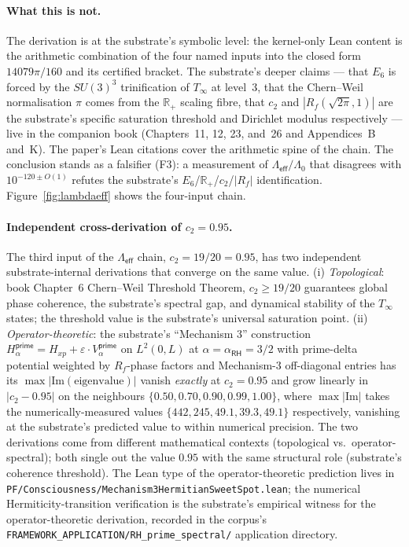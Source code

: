 \documentclass[11pt,a4paper]{amsart}
\theoremstyle{plain}
\theoremstyle{definition}
\begin{document}
\paragraph{What this is not.} The derivation is at the substrate's symbolic level: the kernel-only Lean content is the arithmetic combination of the four named inputs into the closed form $14079\pi/160$ and its certified bracket. The substrate's deeper claims --- that $E_6$ is forced by the $SU(3)^3$ trinification of $T_\infty$ at level~3, that the Chern--Weil normalisation $\pi$ comes from the $\mathbb{R}_+$ scaling fibre, that $c_2$ and $|R_f(\sqrt{2\pi}, 1)|$ are the substrate's specific saturation threshold and Dirichlet modulus respectively --- live in the companion book (Chapters~11, 12, 23, and~26 and Appendices~B and~K). The paper's Lean citations cover the arithmetic spine of the chain. The conclusion stands as a falsifier (F3): a measurement of $\Lambda_{\textsf{eff}}/\Lambda_0$ that disagrees with $10^{-120 \pm O(1)}$ refutes the substrate's $E_6$/$\mathbb{R}_+$/$c_2$/$|R_f|$ identification. Figure~\ref{fig:lambdaeff} shows the four-input chain.

\paragraph{Independent cross-derivation of $c_2 = 0.95$.} The third input of the $\Lambda_{\textsf{eff}}$ chain, $c_2 = 19/20 = 0.95$, has two independent substrate-internal derivations that converge on the same value. (i) \emph{Topological}: book Chapter~6 Chern--Weil Threshold Theorem, $c_2 \geq 19/20$ guarantees global phase coherence, the substrate's spectral gap, and dynamical stability of the $T_\infty$ states; the threshold value is the substrate's universal saturation point. (ii) \emph{Operator-theoretic}: the substrate's ``Mechanism 3'' construction $H_\alpha^{\textsf{prime}} = H_{xp} + \varepsilon \cdot V_\alpha^{\textsf{prime}}$ on $L^2(0, L)$ at $\alpha = \alpha_{\textsf{RH}} = 3/2$ with prime-delta potential weighted by $R_f$-phase factors and Mechanism-3 off-diagonal entries has its $\max|\textrm{Im}(\textrm{eigenvalue})|$ vanish \emph{exactly} at $c_2 = 0.95$ and grow linearly in $|c_2 - 0.95|$ on the neighbours $\{0.50, 0.70, 0.90, 0.99, 1.00\}$, where $\max|\textrm{Im}|$ takes the numerically-measured values $\{442, 245, 49.1, 39.3, 49.1\}$ respectively, vanishing at the substrate's predicted value to within numerical precision. The two derivations come from different mathematical contexts (topological vs.\ operator-spectral); both single out the value $0.95$ with the same structural role (substrate's coherence threshold). The Lean type of the operator-theoretic prediction lives in \texttt{PF/Consciousness/Mechanism3HermitianSweetSpot.lean}; the numerical Hermiticity-transition verification is the substrate's empirical witness for the operator-theoretic derivation, recorded in the corpus's \texttt{FRAMEWORK\_APPLICATION/RH\_prime\_spectral/} application directory.
\end{document}
